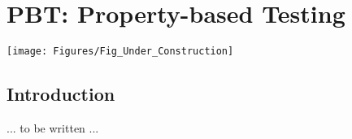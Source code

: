 

\chapter{PBT: Property-based Testing}


\setcounter{page}{1}
\renewcommand{\thepage}{\arabic{chapter}-\arabic{page}}

\label{ch_PBT}


\vspace{2ex}

\centerline{\texttt{[image: Figures/Fig\_Under\_Construction]}}

\vspace{2ex}


\section{Introduction}

... to be written ...


